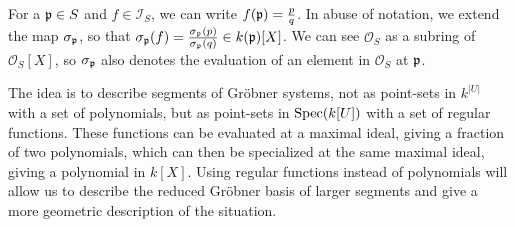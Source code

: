 For a $\mathfrak p \in S$ and $f \in \mathcal I_{S}$, we can write $f(\mathfrak p) = \frac{p}{q}$. In abuse of notation, we extend the map $\sigma_{\mathfrak p}$, so that $\sigma_{\mathfrak p}(f) = \frac{\sigma_{\mathfrak p}(p)}{\sigma_{\mathfrak p}(q)} \in k(\mathfrak p)[X]$. We can see $\mathcal O_{S}$ as a subring of $\mathcal O_{S}[X]$, so $\sigma_{\mathfrak p}$ also denotes the evaluation of an element in $\mathcal O_{S}$ at $\mathfrak p$.

The idea is to describe segments of Gröbner systems, not as point-sets in $k^{|U|}$ with a set of polynomials, but as point-sets in $\operatorname{Spec}(k[U])$ with a set of regular functions. These functions can be evaluated at a maximal ideal, giving a fraction of two polynomials, which can then be specialized at the same maximal ideal, giving a polynomial in $k[X]$. Using regular functions instead of polynomials will allow us to describe the reduced Gröbner basis of larger segments and give a more geometric description of the situation.

